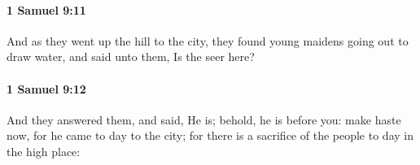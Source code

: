 		\paragraph{1 Samuel 9:11} %
			\label{1SAMUEL-9-11}

			And as they went up the hill to the city, they found young maidens going out to draw water, and said unto them, Is the seer here?


		\paragraph{1 Samuel 9:12} %
			\label{1SAMUEL-9-12}

			And they answered them, and said, He is; behold, he is before you: make haste now, for he came to day to the city; for there is a sacrifice of the people to day in the high place:


